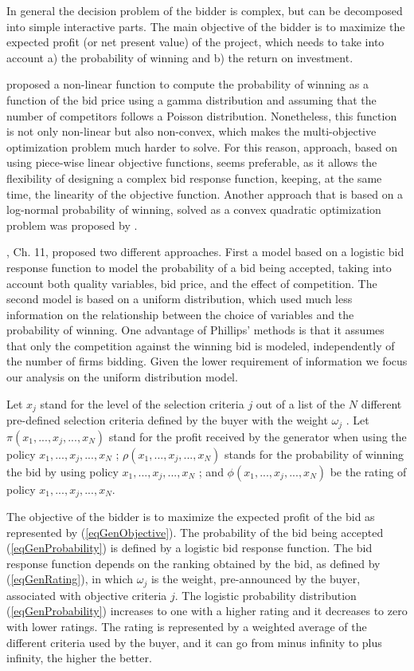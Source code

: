 \documentclass[informs]{informs3}
\begin{document}
In general the decision problem of the bidder is complex, but can be decomposed into simple interactive parts. The main objective of the bidder is to maximize the expected profit (or net present value) of the project, which needs to take into account a) the probability of winning and b) the return on investment. 


\cite{Chen_1989} proposed a non-linear function to compute the probability of winning as a function of the bid price using a gamma distribution and assuming that the number of competitors follows a Poisson distribution. Nonetheless, this function is not only non-linear but also non-convex, which makes the multi-objective optimization problem much harder to solve. For this reason,  approach, based on using piece-wise linear objective functions, seems preferable, as it allows the flexibility of designing a complex bid response function, keeping, at the same time, the linearity of the objective function. Another approach that is based on a log-normal probability of winning, solved as a convex quadratic optimization problem was proposed by . 

, Ch. 11, proposed two different approaches. First a model based on a logistic bid response function to model the probability of a bid being accepted, taking into account both quality variables, bid price, and the effect of competition. The second model is based on a uniform distribution, which used much less information on the relationship between the choice of variables and the probability of winning. One advantage of Phillips’ methods is that it assumes that only the competition against the winning bid is modeled, independently of the number of firms bidding. Given the lower requirement of information we focus our analysis on the uniform distribution model.  

Let $x_j$  stand for the level of the selection criteria $j$ out of a list of the $N$ different pre-defined selection criteria defined by the buyer with the weight $\omega_j$  . Let $\pi(x_1, ..., x_j, ..., x_N)$ stand for the profit received by the generator when using the policy $x_1, ..., x_j, ..., x_N$ ; $\rho(x_1, ..., x_j, ..., x_N)$  stands for the probability of winning the bid by using policy $x_1, ..., x_j, ..., x_N$ ; and $\phi(x_1, ..., x_j, ..., x_N)$  be the rating of policy $x_1, ..., x_j, ..., x_N$.       

The objective of the bidder is to maximize the expected profit of the bid as represented by (\ref{eqGenObjective}). The probability of the bid being accepted (\ref{eqGenProbability}) is defined by a logistic bid response function. The bid response function depends on the ranking  obtained by the bid, as defined by (\ref{eqGenRating}), in which $\omega_j$  is the weight, pre-announced by the buyer, associated with objective criteria $j$. The logistic probability distribution (\ref{eqGenProbability}) increases to one with a higher rating and it decreases to zero with lower ratings. The rating is represented by a weighted average of the different criteria used by the buyer, and it can go from minus infinity to plus infinity, the higher the better.
\end{document}

